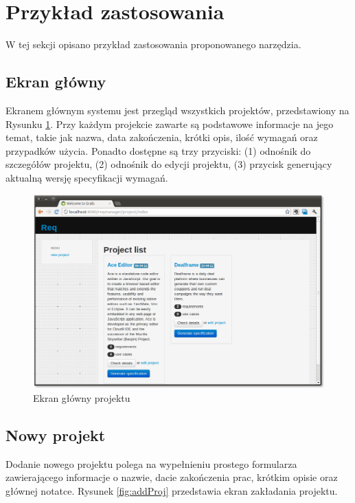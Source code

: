       \newpage

  \section{Przykład zastosowania}
    
    W tej sekcji opisano przykład zastosowania proponowanego narzędzia.

    \subsection{Ekran główny}
      
      Ekranem głównym systemu jest przegląd wszystkich projektów, przedstawiony na Rysunku \ref{fig:mainView}. Przy każdym projekcie zawarte są podstawowe informacje na jego temat, takie jak nazwa, data zakończenia, krótki opis, ilość wymagań oraz przypadków użycia. Ponadto dostępne są trzy przyciski: (1) odnośnik do szczegółów projektu, (2) odnośnik do edycji projektu, (3) przycisk generujący aktualną wersję specyfikacji wymagań. 

      \begin{figure}[t]
        \centering
        \includegraphics[width=1.0\textwidth]{img/tut_screen_1.png}
        \caption{Ekran główny projektu}
        \label{fig:mainView}
      \end{figure}

    \subsection{Nowy projekt}
    
      Dodanie nowego projektu polega na wypełnieniu prostego formularza zawierającego informacje o nazwie, dacie zakończenia prac, krótkim opisie oraz głównej notatce. Rysunek \ref{fig:addProj} przedstawia ekran zakładania projektu.

